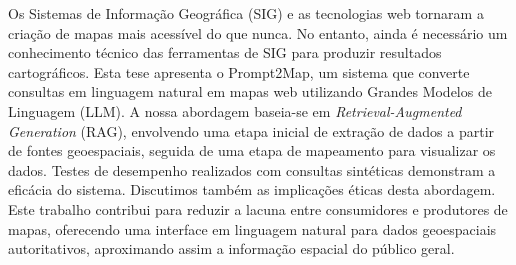 
%

Os Sistemas de Informação Geográfica (SIG) e as tecnologias web tornaram a criação de mapas mais acessível do que nunca. No entanto, ainda é necessário um conhecimento técnico das ferramentas de SIG para produzir resultados cartográficos.
Esta tese apresenta o Prompt2Map, um sistema que converte consultas em linguagem natural em mapas web utilizando Grandes Modelos de Linguagem (LLM).
A nossa abordagem baseia-se em \textit{Retrieval-Augmented Generation} (RAG), envolvendo uma etapa inicial de extração de dados a partir de fontes geoespaciais, seguida de uma etapa de mapeamento para visualizar os dados.
Testes de desempenho realizados com consultas sintéticas demonstram a eficácia do sistema.
Discutimos também as implicações éticas desta abordagem.
Este trabalho contribui para reduzir a lacuna entre consumidores e produtores de mapas, oferecendo uma interface em linguagem natural para dados geoespaciais autoritativos, aproximando assim a informação espacial do público geral.

